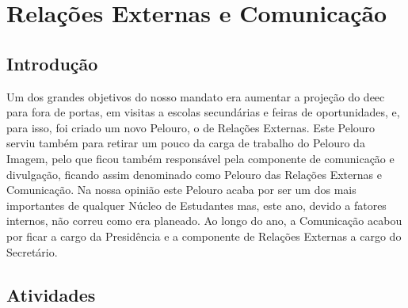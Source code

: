
\section{Relações Externas e Comunicação}

\subsection{Introdução}

Um dos grandes objetivos do nosso mandato era aumentar a projeção do \acrshort{deec} para fora de portas, em visitas a escolas secundárias e feiras de oportunidades, e, para isso, foi criado um novo Pelouro, o de Relações Externas. Este Pelouro serviu também para retirar um pouco da carga de trabalho do Pelouro da Imagem, pelo que ficou também responsável pela componente de comunicação e divulgação, ficando assim denominado como Pelouro das Relações Externas e Comunicação. Na nossa opinião este Pelouro acaba por ser um dos mais importantes de qualquer Núcleo de Estudantes mas, este ano, devido a fatores internos, não correu como era planeado. Ao longo do ano, a Comunicação acabou por ficar a cargo da Presidência e a componente de Relações Externas a cargo do Secretário.

\subsection{Atividades}












